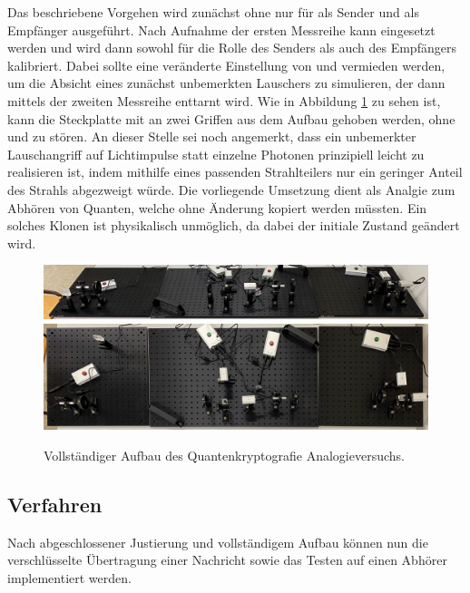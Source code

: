 Das beschriebene Vorgehen wird zunächst ohne \grqq{} nur für \grqq{} als Sender und \grqq{} als
Empfänger ausgeführt. Nach Aufnahme der ersten Messreihe kann \grqq{} eingesetzt werden und wird dann sowohl für die
Rolle des Senders als auch des Empfängers kalibriert. Dabei sollte eine veränderte Einstellung von \grqq{} und
\grqq{} vermieden werden, um die Absicht eines zunächst unbemerkten Lauschers zu simulieren, der dann mittels der
zweiten Messreihe enttarnt wird. Wie in Abbildung \ref{fig:aufbau} zu sehen ist, kann die Steckplatte mit \grqq{}
an zwei Griffen aus dem Aufbau gehoben werden, ohne \grqq{} und \grqq{} zu stören. An dieser Stelle
sei noch angemerkt, dass ein unbemerkter Lauschangriff auf Lichtimpulse statt einzelne Photonen prinzipiell leicht zu
realisieren ist, indem mithilfe eines passenden Strahlteilers nur ein geringer Anteil des Strahls abgezweigt würde. Die
vorliegende Umsetzung dient als Analgie zum Abhören von Quanten, welche ohne Änderung kopiert werden müssten. Ein solches
Klonen ist physikalisch unmöglich, da dabei der initiale Zustand geändert wird.

\begin{figure}[H]
	\centering
	\includegraphics[width=1.0\textwidth]{content/aufbau/front.jpg}\\[1ex]
	\includegraphics[width=1.0\textwidth]{content/aufbau/drauf.jpg}
	\caption{Vollständiger Aufbau des Quantenkryptografie Analogieversuchs.}
	\label{fig:aufbau}
\end{figure}



\subsection{Verfahren}

Nach abgeschlossener Justierung und vollständigem Aufbau können nun die verschlüsselte Übertragung einer Nachricht sowie das
Testen auf einen Abhörer implementiert werden.


